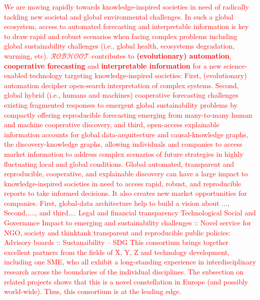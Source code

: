 \documentclass[11pt, a4paper]{article} %
\begin{document}
\textcolor{red}{We are moving rapidly towards knowledge-inspired societies in need of
radically tackling new societal and global environmental
challenges. In such a global ecosystem, access to automated
forecasting and interpretable information is key to draw rapid and
robust scenarios when facing complex problems including global
sustainability challenges (i.e., global health, ecosystems
degradation, warming, etc). {\bf $\mathcal{ROBHOOT}$} contributes to
{\bf (evolutionary) automation}, {\bf cooperative forecasting} and
{\bf interpretable information} for a new science-enabled technology
targeting knowledge-inspired societies: First, (evolutionary)
automation decipher open-search interpretation of complex
systems. Second, global hybrid (i.e., humans and machines) cooperative
forecasting challenges existing fragmented responses to emergent
global sustainability problems by compactly offering reproducible
forecasting emerging from many-to-many human and machine cooperative
discovery, and third, open-access explainable information accounts for
global data-arquitecture and causal-knowledge graphs, the
discovery-knowledge graphs, allowing individuals and companies to
access market information to address complex scenarios of future
strategies in highly fluctuating local and global conditions.
Global automated, transparent and reproducible, cooperative, and
explainable discovery can have a large impact to knowledge-inspired
societies in need to access rapid, robust, and reproducible reports to
take informed decisions. It also creates new market opportunities for
companies. First, global-data architecture help to build a vision
about ..., Second,...., and third....
Legal and financial transparency 
Technological
Social and Governance 
Impact to emerging and sustainability challenges ::
Novel service for NGO, society and thinktank transparent and
reproducible public policies:
Advisory boards :: 
Sustanaibility -- SDG 
This consortium brings together excellent partners from the fields of
X, Y, Z and technology development, including one SME, who all exhibit
a long-standing experience in interdisciplinary research across the
boundaries of the individual disciplines. The subsection on related
projects shows that this is a novel constellation in Europe (and
possibly world-wide). Thus, this consortium is at the leading edge.}
\end{document}
